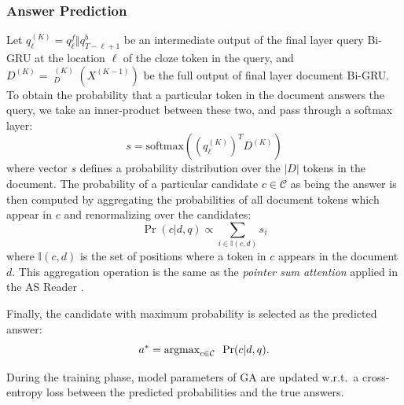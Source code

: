 \documentclass[11pt,a4paper]{article}
\DeclareMathOperator{\bigru}{\overset{\longleftrightarrow}{\mathrm{GRU}}}
\begin{document}
\subsubsection{Answer Prediction}
Let $q^{(K)}_\ell = q_\ell^f\Vert q^b_{T-\ell+1}$ be an intermediate output of the final layer query Bi-GRU at the location $\ell$ of the cloze token in the query,
and $D^{(K)} = \bigru^{(K)}_D(X^{(K-1)})$ be the full output of final layer document Bi-GRU. To obtain the probability that a particular token in the document answers the query, we take an inner-product between these two, and pass through a softmax layer:
\begin{equation}
\label{eq:att}
s = \text{softmax}((q^{(K)}_\ell)^T D^{(K)})
\end{equation}
where vector $s$ defines a probability distribution over the $|D|$ tokens in the document. The probability of a particular candidate $c \in \mathcal{C}$ as being the answer is then computed by aggregating the probabilities of all document tokens which appear in $c$ and renormalizing over the candidates:
\begin{equation}
    \Pr(c|d,q) \propto \sum_{i\in \mathbb{I}(c,d)} s_i
\end{equation}
where $\mathbb{I}(c,d)$ is the set of positions where a token in $c$ appears in the document $d$. This aggregation operation is the same as the \textit{pointer sum attention} applied in the AS Reader \citep{kadlec2016text}.

Finally, the candidate with maximum probability is selected as the predicted answer:
\begin{equation}
    a^* = \mathrm{argmax}_{c \in \mathcal{C}} \enskip \Pr(c|d,q).
\end{equation}

During the training phase,
model parameters of GA are updated w.r.t.\ a cross-entropy loss between the predicted probabilities and the true answers.
\end{document}
